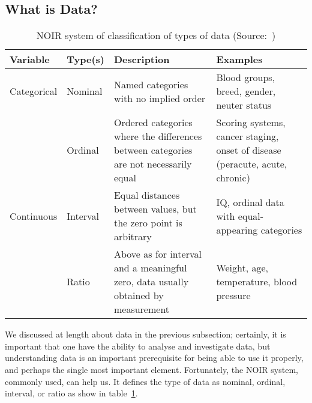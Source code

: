 \subsection{What is Data?}
\begin{table}[ht]
    \begin{tabularx}{\textwidth}{
            | >{\raggedright\arraybackslash} m{1.8cm}
            | >{\raggedright\arraybackslash} m{1.8cm}
            | >{\raggedright\arraybackslash} X
            | >{\raggedright\arraybackslash} X |}
        \toprule
        \hfil\bfseries Variable & \hfil\bfseries Type(s) & \hfil\bfseries Description                                                            & \hfil\bfseries Examples                                                      \\
        \midrule
        Categorical             & Nominal                & Named categories with no implied order                                                & Blood groups, breed, gender, neuter status                                   \\
        ~                       & Ordinal                & Ordered categories where the differences between categories are not necessarily equal & Scoring systems, cancer staging, onset of disease (peracute, acute, chronic) \\
        \midrule
        Continuous              & Interval               & Equal distances between values, but the zero point is arbitrary                        & IQ, ordinal data with equal-appearing categories                             \\
        ~                       & Ratio                  & Above as for interval and a meaningful zero, data usually obtained by measurement     & Weight, age, temperature, blood pressure                                     \\
        \bottomrule
    \end{tabularx}
    \caption{NOIR system of classification of types of data (Source:~\cite{Article:intro_to_data_analysis})}
    \label{table:noir_sys}
\end{table}
We discussed at length about data in the previous subsection; certainly, it is important that one have the ability to analyse and investigate data, but 
understanding data is an important prerequisite for being able to use it properly, and perhaps the single most important element.
Fortunately, the NOIR system, commonly used, can help us. It defines the type of data as nominal, ordinal, interval, or ratio as show in table~\ref{table:noir_sys}.

